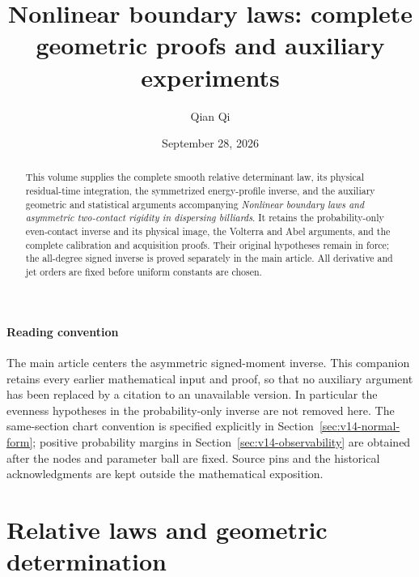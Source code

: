 
\title[Boundary laws: complete proofs]{Nonlinear boundary laws: complete geometric proofs
and auxiliary experiments}
\author{Qian Qi}
\date{September 28, 2026}

\begin{abstract}
This volume supplies the complete smooth relative determinant law,
its physical residual-time integration, the symmetrized energy-profile
inverse, and the auxiliary geometric and statistical arguments accompanying
\emph{Nonlinear boundary laws and asymmetric two-contact rigidity in
dispersing billiards}. It retains the probability-only even-contact
inverse and its physical image, the Volterra and Abel arguments, and
the complete calibration and acquisition proofs. Their original
hypotheses remain in force; the all-degree signed inverse is proved
separately in the main article. All derivative and jet orders are fixed
before uniform constants are chosen.
\end{abstract}
\maketitle
\subsection*{Reading convention}
The main article centers the asymmetric signed-moment inverse. This
companion retains every earlier mathematical input and proof, so that
no auxiliary argument has been replaced by a citation to an unavailable
version. In particular the evenness hypotheses in the probability-only
inverse are not removed here. The same-section chart convention is
specified explicitly in Section~\ref{sec:v14-normal-form}; positive
probability margins in Section~\ref{sec:v14-observability} are obtained
after the nodes and parameter ball are fixed. Source pins and the
historical acknowledgments are kept outside the mathematical exposition.
\tableofcontents


\part{Relative laws and geometric determination}












